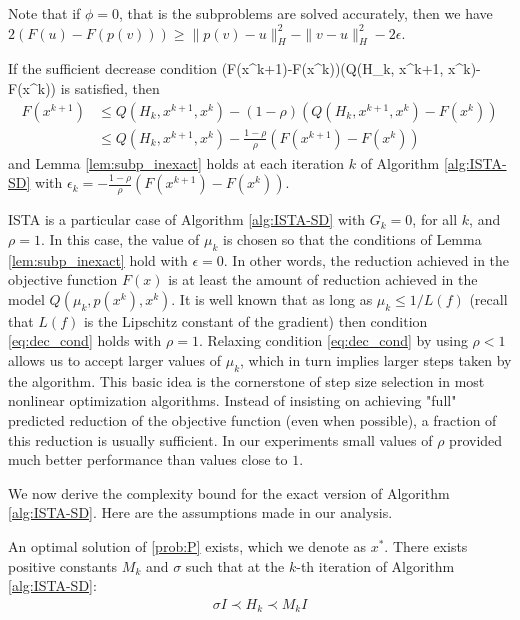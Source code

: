 \documentclass[11pt]{article}
\numberwithin{equation}{section}
\begin{document}
\vskip5mm

Note that if $\phi=0$, that is the subproblems are solved accurately, then we have $2(F(u) - F(p( v))) \geq \|p( v)-u\|_H^2 - \|v-u\|_H^2-2\epsilon$.

If the sufficient decrease  condition 
\bea\label{eq:dec_cond}
(F(x^{k+1})-F(x^k))\leq \rho (Q(H_k, x^{k+1}, x^k)- F(x^k))
\eea
is satisfied, then
\begin{align*}
    F(x^{k+1})
    &\leq Q(H_k, x^{k+1}, x^k)  - (1-\rho) \left( Q(H_k, x^{k+1}, x^k)- F(x^k) \right) \\
    &\leq Q(H_k,  x^{k+1}, x^k)  - \frac{1-\rho}{\rho} (F(x^{k+1})- F(x^k))
\end{align*}
and  Lemma \ref{lem:subp_inexact} holds at each iteration $k$ of Algorithm \ref{alg:ISTA-SD} with  $\epsilon_k=-\frac{1-\rho}{\rho}(F(x^{k+1})- F(x^k))$. 

 ISTA  \cite{Beck2009} is a particular case of Algorithm \ref{alg:ISTA-SD} with $G_k=0$, for all $k$, and $\rho=1$. 
In this case, the value of  $\mu_k$ is chosen so that the conditions of Lemma \ref{lem:subp_inexact} hold with $\epsilon=0$. In other words, the reduction achieved in the objective function $F(x)$ is at least the amount of reduction achieved in the model 
$ Q(\mu_k,p(x^k),x^k)$. It is well known that as long as $\mu_k\leq 1/L(f)$ (recall that $L(f)$ is the Lipschitz constant of the gradient) then  condition \eqref{eq:dec_cond}
 holds with $\rho=1$.  Relaxing condition \eqref{eq:dec_cond} by using $\rho<1$ allows us to accept larger values of $\mu_k$, which in turn implies larger steps taken by the algorithm.   This basic idea is the cornerstone of step size selection in most nonlinear optimization algorithms. Instead of insisting on achieving "full" predicted reduction of the objective function (even when possible), a fraction of this reduction is usually sufficient. In our experiments small values of $\rho$ provided much better performance than values close to $1$. 

We now derive the complexity bound for  the exact version of Algorithm \ref{alg:ISTA-SD}. Here are the assumptions made in our analysis.
\begin{assumption}\leavevmode %
\label{as:exact_conv_rate}
	\assume
	\label{assub:optimal_exist}
	An optimal solution of \eqref{prob:P} exists, which we denote as $x^*$.
	\assume 
	\label{assub:bound_h}
	There exists positive constants $M_k$ and $\sigma$ such that at the $k$-th iteration of Algorithm \ref{alg:ISTA-SD}: 
	\begin{align*}
	     \sigma I \prec H_k \prec M_kI
	\end{align*} 
\end{assumption}
\end{document}

